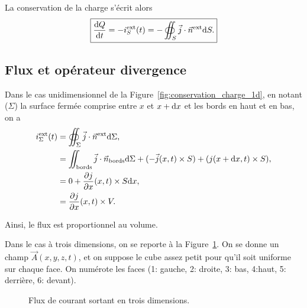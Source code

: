         La conservation de la charge s'écrit alors
        \begin{equation*}
            \boxed{
                \frac{\mathrm{d} Q}{\mathrm{d} t}=-i_{S}^{\text{ext}}(t)=-\oiint_{S}\vec{j}\cdot\vec{n}^{\text{ext}}\mathrm{d} S.
            }
        \end{equation*}

    \subsection{Flux et opérateur \og divergence\fg}

        Dans le cas unidimensionnel de la Figure~\ref{fig:conservation_charge_1d}, en notant ($\Sigma$) la surface fermée comprise entre $x$ et $x+\mathrm{d} x$ et les bords en haut et en bas, on a 
        \begin{align*}
            i_{\Sigma}^{\text{ext}}(t)
            &=
            \oiint_{\Sigma}\vec{j}\cdot\vec{n}^{\text{ext}}\mathrm{d}\Sigma,\\
            &=
            \iint_{\text{bords}}\vec{j}\cdot\vec{n}_{\text{bords}}\mathrm{d}\Sigma+(-\vec{j}(x,t)\times S)+(j(x+\mathrm{d} x,t)\times S),\\
            &= 0 +\frac{\partial j}{\partial x}(x,t)\times S\mathrm{d} x,\\
            &=\frac{\partial j}{\partial x}(x,t) \times V.
        \end{align*}

        Ainsi, le flux est proportionnel au volume.

        Dans le cas à trois dimensions, on se reporte à la Figure~\ref{fig:flux_operateur_divergence_trois_dimensions}. On se donne un champ $\vec{A}(x,y,z,t)$, et on suppose le cube assez petit pour qu'il soit uniforme sur chaque face. On numérote les faces (1: gauche, 2: droite, 3: bas, 4:haut, 5: derrière, 6: devant).

        \begin{figure}
            \centering
            \caption{Flux de courant sortant en trois dimensions.}    
            \label{fig:flux_operateur_divergence_trois_dimensions}
        \end{figure}

